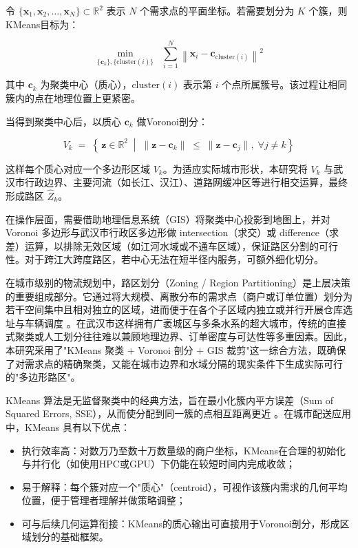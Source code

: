 \documentclass[12pt,a4paper,twoside]{ctexbook}
\begin{document}
令 $\{ \mathbf{x}_1, \mathbf{x}_2, \dots, \mathbf{x}_N \}\subset \mathbb{R}^2$ 表示 $N$ 个需求点的平面坐标。若需要划分为 $K$ 个簇，则KMeans目标为：

\begin{equation}\label{eq:2.1}
\min_{\{\mathbf{c}_k\}, \{\mathrm{cluster}(i)\}} \;\; \sum_{i=1}^{N} \left\| \mathbf{x}_i - \mathbf{c}_{\mathrm{cluster}(i)} \right\|^2
\end{equation}

其中 $\mathbf{c}_k$ 为聚类中心（质心），$\mathrm{cluster}(i)$ 表示第 $i$ 个点所属簇号。该过程让相同簇内的点在地理位置上更紧密。

当得到聚类中心后，以质心 $\mathbf{c}_k$ 做Voronoi剖分：

\begin{equation}\label{eq:2.2}
V_k \;=\; \left\{\, \mathbf{z}\in \mathbb{R}^2 \;\middle|\; \|\mathbf{z} - \mathbf{c}_k\|\;\le\;\|\mathbf{z} - \mathbf{c}_j\|, \;\forall j\neq k \right\}
\end{equation}

这样每个质心对应一个多边形区域 $V_k$。为适应实际城市形状，本研究将 $V_k$ 与武汉市行政边界、主要河流（如长江、汉江）、道路网缓冲区等进行相交运算，最终形成路区 $\hat{Z}_k$。

在操作层面，需要借助地理信息系统（GIS）将聚类中心投影到地图上，并对 Voronoi 多边形与武汉市行政区多边形做 intersection（求交）或 difference（求差）运算，以排除无效区域（如江河水域或不通车区域），保证路区分割的可行性\cite{4}。对于跨江大跨度路区，若中心无法在短半径内服务，可额外细化切分。

在城市级别的物流规划中，路区划分（Zoning / Region Partitioning）是上层决策的重要组成部分。它通过将大规模、离散分布的需求点（商户或订单位置）划分为若干空间集中且相对独立的区域，进而便于在各个子区域内独立或并行开展仓库选址与车辆调度 \cite{Taniguchi2018}。在武汉市这样拥有广袤城区与多条水系的超大城市，传统的直接式聚类或人工划分往往难以兼顾地理边界、订单密度与可达性等多重因素。因此，本研究采用了"KMeans 聚类 + Voronoi 剖分 + GIS 裁剪"这一综合方法，既确保了对需求点的精确聚类，又能在城市边界和水域分隔的现实条件下生成实际可行的"多边形路区"。

KMeans 算法是无监督聚类中的经典方法，旨在最小化簇内平方误差（Sum of Squared Errors, SSE），从而使分配到同一簇的点相互距离更近 \cite{Lloyd1982}。在城市配送应用中，KMeans 具有以下优点：

\begin{itemize}
    \item 执行效率高：对数万乃至数十万数量级的商户坐标，KMeans在合理的初始化与并行化（如使用HPC或GPU）下仍能在较短时间内完成收敛；
    \item 易于解释：每个簇对应一个"质心"（centroid），可视作该簇内需求的几何平均位置，便于管理者理解并做策略调整；
    \item 可与后续几何运算衔接：KMeans的质心输出可直接用于Voronoi剖分，形成区域划分的基础框架。
\end{itemize}
\end{document}
